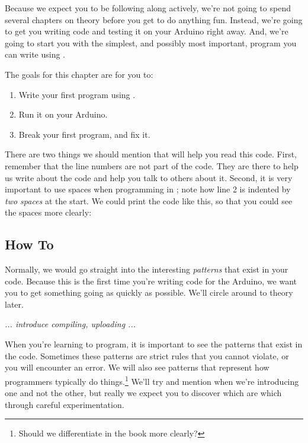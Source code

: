 
Because we expect you to be following along actively, we're not going to spend several chapters on theory before you get to do anything fun. Instead, we're going to get you writing code and testing it on your Arduino right away. And, we're going to start you with the simplest, and possibly most important, program you can write using \plumbing.

\GOALS
The goals for this chapter are for you to:

\begin{enumerate}
	\item Write your first program using \plumbing.
	\item Run it on your Arduino.
	\item Break your first program, and fix it.
\end{enumerate}

\CODE


There are two things we should mention that will help you read this code. First, remember that the {\strong line numbers are not part of the code}. They are there to help us write about the code and help you talk to others about it. Second, it is very important to use spaces when programming in \occam; note how line 2 is indented by {\em two spaces} at the start. We could print the code like this, so that you could see the spaces more clearly:

\CODE



\subsection{How To}
Normally, we would go straight into the interesting {\em patterns} that exist in your code. Because this is the first time you're writing \plumbing code for the Arduino, we want you to get something going as quickly as possible. We'll circle around to theory later.

{\em ... introduce compiling, uploading ...}

\PATTERNS
When you're learning to program, it is important to see the patterns that exist in the code. Sometimes these patterns are strict rules that you cannot violate, or you will encounter an error. We will also see patterns that represent how programmers typically do things.\footnote{Should we differentiate in the book more clearly?} We'll try and mention when we're introducing one and not the other, but really we expect you to discover which are which through careful experimentation.

